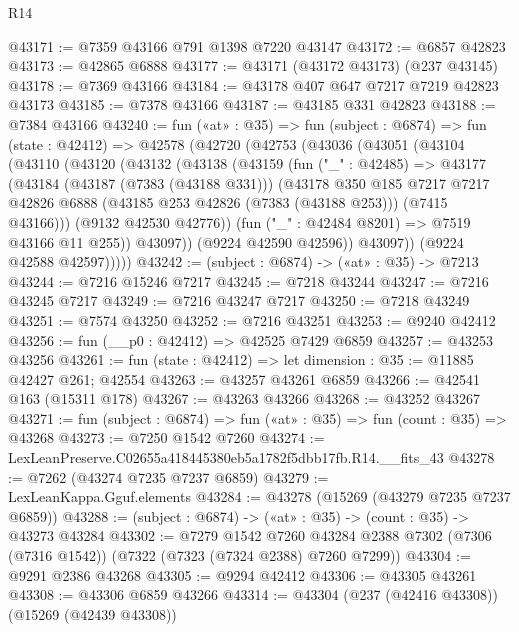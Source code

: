 \begin{lexlean}{R14}
\begin{coremodule}
@43171 := @7359 @43166 @791 @1398 @7220 @43147
@43172 := @6857 @42823
@43173 := @42865 @6888
@43177 := @43171 (@43172 @43173) (@237 @43145)
@43178 := @7369 @43166
@43184 := @43178 @407 @647 @7217 @7219 @42823 @43173
@43185 := @7378 @43166
@43187 := @43185 @331 @42823
@43188 := @7384 @43166
@43240 := fun («at» : @35) =>
  fun (subject : @6874) =>
  fun (state : @42412) =>
  @42578
    (@42720
      (@42753
        (@43036
          (@43051
            (@43104
              (@43110
                (@43120
                  (@43132
                    (@43138
                      (@43159
                        (fun ("_" : @42485) =>
                        @43177
                          (@43184
                            (@43187 (@7383 (@43188 @331)))
                            (@43178
                              @350
                              @185
                              @7217
                              @7217
                              @42826
                              @6888
                              (@43185 @253 @42826 (@7383 (@43188 @253)))
                              (@7415 @43166)))
                          (@9132 @42530 @42776))
                        (fun ("_" : @42484 @8201) => @7519 @43166 @11 @255))
                      @43097))
                  (@9224 @42590 @42596))
                @43097))
            (@9224 @42588 @42597)))))
@43242 := (subject : @6874) -> («at» : @35) -> @7213
@43244 := @7216 @15246 @7217
@43245 := @7218 @43244
@43247 := @7216 @43245 @7217
@43249 := @7216 @43247 @7217
@43250 := @7218 @43249
@43251 := @7574 @43250
@43252 := @7216 @43251
@43253 := @9240 @42412
@43256 := fun (__p0 : @42412) => @42525 @7429 @6859
@43257 := @43253 @43256
@43261 := fun (state : @42412) => let dimension : @35 := @11885 @42427 @261; @42554
@43263 := @43257 @43261 @6859
@43266 := @42541 @163 (@15311 @178)
@43267 := @43263 @43266
@43268 := @43252 @43267
@43271 := fun (subject : @6874) => fun («at» : @35) => fun (count : @35) => @43268
@43273 := @7250 @1542 @7260
@43274 := LexLeanPreserve.C02655a418445380eb5a1782f5dbb17fb.R14.__fits_43
@43278 := @7262 (@43274 @7235 @7237 @6859)
@43279 := LexLeanKappa.Gguf.elements
@43284 := @43278 (@15269 (@43279 @7235 @7237 @6859))
@43288 := (subject : @6874) -> («at» : @35) -> (count : @35) -> @43273 @43284
@43302 := @7279
    @1542
    @7260
    @43284
    @2388
    @7302
    (@7306 (@7316 @1542))
    (@7322 (@7323 (@7324 @2388) @7260 @7299))
@43304 := @9291 @2386 @43268
@43305 := @9294 @42412
@43306 := @43305 @43261
@43308 := @43306 @6859 @43266
@43314 := @43304 (@237 (@42416 @43308)) (@15269 (@42439 @43308))

\end{coremodule}
\end{lexlean}
